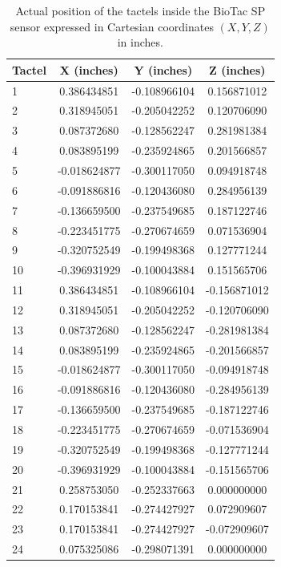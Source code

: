 \begin{table}[!htb]
    \centering
    \caption{Actual position of the tactels inside the BioTac SP sensor expressed in Cartesian coordinates $(X,Y,Z)$ in inches.}
    \begin{tabular}{lccc}
        \hline
        \textbf{Tactel} & \textbf{X (inches)} & \textbf{Y (inches)} & \textbf{Z (inches)}       \\
        \hline
        1     & 0.386434851  & -0.108966104 & 0.156871012  \\
        2     & 0.318945051  & -0.205042252 & 0.120706090  \\
        3     & 0.087372680  & -0.128562247 & 0.281981384  \\
        4     & 0.083895199  & -0.235924865 & 0.201566857  \\
        5     & -0.018624877 & -0.300117050 & 0.094918748  \\
        6     & -0.091886816 & -0.120436080 & 0.284956139  \\
        7     & -0.136659500 & -0.237549685 & 0.187122746  \\
        8     & -0.223451775 & -0.270674659 & 0.071536904  \\
        9     & -0.320752549 & -0.199498368 & 0.127771244  \\
        10    & -0.396931929 & -0.100043884 & 0.151565706  \\
        11    & 0.386434851  & -0.108966104 & -0.156871012 \\
        12    & 0.318945051  & -0.205042252 & -0.120706090 \\
        13    & 0.087372680  & -0.128562247 & -0.281981384 \\
        14    & 0.083895199  & -0.235924865 & -0.201566857 \\
        15    & -0.018624877 & -0.300117050 & -0.094918748 \\
        16    & -0.091886816 & -0.120436080 & -0.284956139 \\
        17    & -0.136659500 & -0.237549685 & -0.187122746 \\
        18    & -0.223451775 & -0.270674659 & -0.071536904 \\
        19    & -0.320752549 & -0.199498368 & -0.127771244 \\
        20    & -0.396931929 & -0.100043884 & -0.151565706 \\
        21    & 0.258753050  & -0.252337663 & 0.000000000  \\
        22    & 0.170153841  & -0.274427927 & 0.072909607  \\
        23    & 0.170153841  & -0.274427927 & -0.072909607 \\
        24    & 0.075325086  & -0.298071391 & 0.000000000\\
        \hline
    \end{tabular}
    \label{table:taxel_coordinates}
\end{table}

